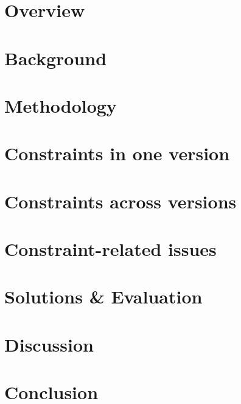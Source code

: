 \section{Overview}

% 

\section{Background}

\section{Methodology}
\label{sec:meth}



\section{Constraints in one version}
\label{sec:wherewhat}


\section{Constraints   across versions}
\label{sec:evolve}


\section{Constraint-related issues}
\label{sec:causes}


 \section{Solutions \& Evaluation}
\label{sec:solution}
 
 

\section{Discussion}
\label{sec:threats}




\section{Conclusion}

